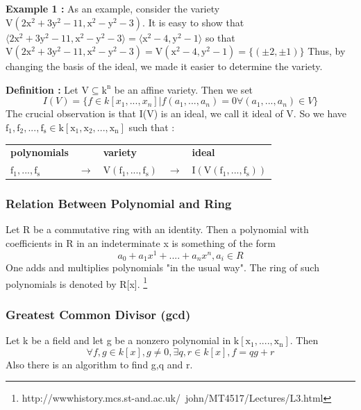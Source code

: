 \documentclass[11pt]{article}
\begin{document}
 \textbf{Example 1 :}\newline
As an example, consider the variety $\mathrm{V(2x^2+3y^2-11,x^2-y^2-3)}$. \newline It is easy to show that \newline $\mathrm{\langle 2x^2+3y^2-11,x^2-y^2-3 \rangle = \langle x^2-4,y^2-1 \rangle }$
so that \newline
$\mathrm{V(2x^2+3y^2-11,x^2-y^2-3)=V(x^2-4,y^2-1)=\{( \pm 2,\pm 1)\} }$\newline
Thus, by changing the basis of the ideal, we made it easier to determine the variety.\newline

\textbf{Definition  :}\newline
Let $\mathrm{V \subseteq k^n}$ be an affine variety. Then we set
\begin{equation}
  I(V)= \{ f \in k[x_1,...,x_n] | f(a_1,...,a_n)=0 \forall (a_1,...,a_n) \in V \}
\end{equation}
The crucial observation is that I(V) is an ideal, we call it ideal of V. So we have $\mathrm{f_1,f_2,...,f_s \in k[x_1,x_2,...,x_n]}$ such that : \newline

\begin{center}
\begin{tabular}{ l l l l l }
\textbf{polynomials} &  &\textbf{variety}&  & \textbf{ideal} \\
$\mathrm{f_1,...,f_s }$ & $\mathrm{\longrightarrow}$&$\mathrm{V(f_1,...,f_s)}$ &$\mathrm{\longrightarrow}$ & $\mathrm{I(V(f_1,...,f_s))}$ \\
\end{tabular}
\end{center}


\subsubsection{Relation Between Polynomial and Ring}
Let R be a commutative ring with an identity. Then a polynomial with coefficients in R in an indeterminate x is something of the form
\begin{equation}
   a_0+a_1x^1+....+a_nx^n , a_i \in R
\end{equation}
One adds and multiplies polynomials "in the usual way". The ring of such polynomials is denoted by R[x]. \footnote{http://www\-history.mcs.st-and.ac.uk/~john/MT4517/Lectures/L3.html}

\subsubsection{Greatest Common Divisor (gcd)}
Let k be a field and let g be a nonzero polynomial in $\mathrm{k[x_1,....,x_n]}$. Then
\begin{equation}
   \forall f,g \in k[x] , g \neq 0, \exists q,r \in k[x] , f=qg+r
\end{equation}
Also there is an algorithm to find g,q and r.\newline
\end{document}
